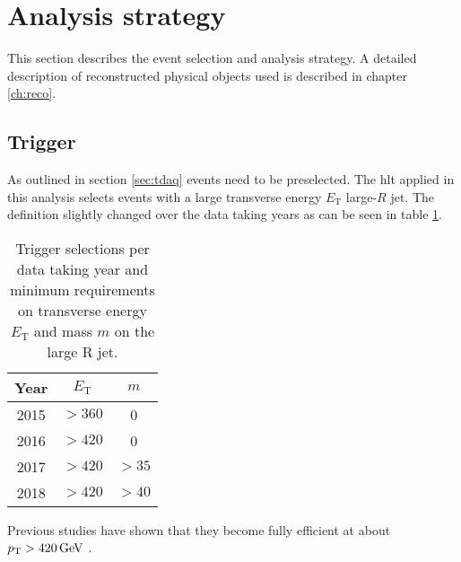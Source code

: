 
\section{Analysis strategy}
This section describes the event selection and analysis strategy. A detailed description of reconstructed physical objects used is described in chapter \ref{ch:reco}.

\subsection{Trigger}
As outlined in section \ref{sec:tdaq} events need to be preselected. The \ac{hlt} applied in this analysis selects events with a large transverse energy $E_\text{T}$ large-$R$ jet. The definition slightly changed over the data taking years as can be seen in table \ref{tab:trigger}.
\begin{table}[htbp]
    \centering
    \caption{Trigger selections per data taking year and minimum requirements on transverse energy $E_\text{T}$ and mass $m$ on the large R jet. }
    \begin{tabular}{ccc}
        \hline
        Year & $E_\text{T}$ & $m$   \\ \hline
        2015 & $>360$       & 0     \\
        2016 & $>420$       & 0     \\
        2017 & $>420$       & $>35$ \\
        2018 & $>420$       & $>40$ \\ \hline
    \end{tabular}
    \label{tab:trigger}
\end{table}
Previous studies have shown that they become fully efficient at about $p_{\text{T}}>\qty[]{420}{GeV}$ \citep{ATL-COM-PHYS-2020-083,ATL-COM-PHYS-2023-033}.


